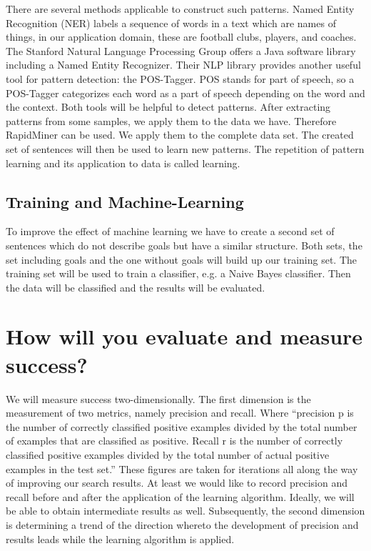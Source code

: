 \documentclass[11pt,titlepage,oneside,openany]{book}
\begin{document}
There are several methods applicable to construct such patterns. Named Entity Recognition (NER) labels a sequence of words in a text which are names of things, in our application domain, these are football clubs, players, and coaches. The Stanford Natural Language Processing Group offers a Java software library including a Named Entity Recognizer. Their NLP library provides another useful tool for pattern detection: the POS-Tagger. POS stands for part of speech, so a POS-Tagger categorizes each word as a part of speech depending on the word and the context. Both tools will be helpful to detect patterns.
After extracting patterns from some samples, we apply them to the data we have. Therefore RapidMiner can be used. We apply them to the complete data set. The created set of sentences will then be used to learn new patterns. The repetition of pattern learning and its application to data is called learning.

\subsection{Training and Machine-Learning}
To improve the effect of machine learning we have to create a second set of sentences which do not describe goals but have a similar structure. 
Both sets, the set including goals and the one without goals will build up our training set. The training set will be used to train a classifier, e.g. a Naive Bayes classifier. Then the data will be classified and the results will be evaluated.

\section{How will you evaluate and measure success?}

We will measure success two-dimensionally. The first dimension is the measurement of two metrics, namely precision and recall. Where ``precision p is the number of correctly classified positive examples divided by the total number of examples that are classified as positive. Recall r is the number of correctly classified positive examples divided by the total number of actual positive examples in the test set.'' \citep[p.103]{Liu2007} These figures are taken for iterations all along the way of improving our search results. At least we would like to record precision and recall before and after the application of the learning algorithm. Ideally, we will be able to obtain intermediate results as well. Subsequently, the second dimension is determining a trend of the direction whereto the development of precision and results leads while the learning algorithm is applied.



\end{document}
